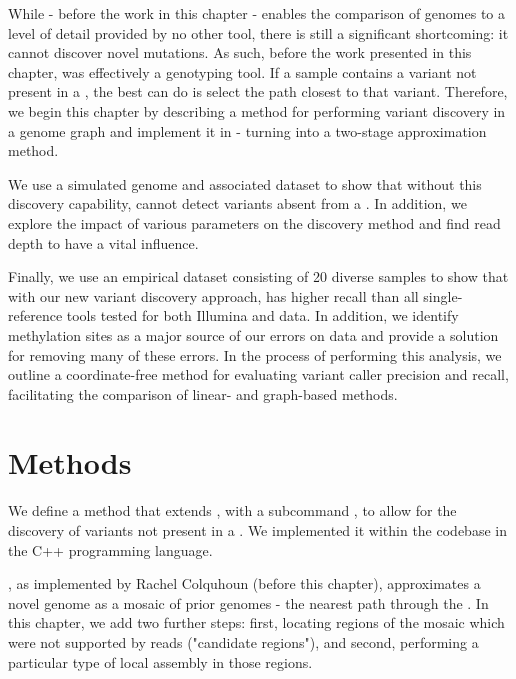 While \pandora{} - before the work in this chapter - enables the comparison of genomes to a level of detail provided by no other tool, there is still a significant shortcoming: it cannot discover novel mutations. As such, before the work presented in this chapter, \pandora{} was effectively a genotyping tool. If a sample contains a variant not present in a \prg{}, the best \pandora{} can do is select the path closest to that variant. Therefore, we begin this chapter by describing a method for performing \denovo{} variant discovery in a genome graph and implement it in \pandora{} - turning \pandora{} into a two-stage approximation method.

We use a simulated genome and associated \ont{} dataset to show that without this discovery capability, \pandora{} cannot detect variants absent from a \prg{}. In addition, we explore the impact of various parameters on the \denovo{} discovery method and find read depth to have a vital influence.

Finally, we use an empirical dataset consisting of 20 diverse \ecoli{} samples to show that with our new variant discovery approach, \pandora{} has higher recall than all single-reference tools tested for both Illumina and \ont{} data. In addition, we identify methylation sites as a major source of our errors on \ont{} data and provide a solution for removing many of these errors. In the process of performing this analysis, we outline a coordinate-free method for evaluating variant caller precision and recall, facilitating the comparison of linear- and graph-based methods. 

\section{Methods}
\label{sec:denovo-method}

We define a method that extends \pandora{}, with a subcommand , to allow for the \denovo{} discovery of variants not present in a \prg{}. We implemented it within the \pandora{} codebase in the C++ programming language. 

\pandora{}, as implemented by Rachel Colquhoun (before this chapter), approximates a novel genome as a mosaic of prior genomes - the nearest path through the \panrg{}. In this chapter, we add two further steps: first, locating regions of the mosaic which were not supported by reads ("candidate regions"), and second, performing a particular type of local assembly in those regions.

